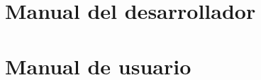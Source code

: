 \null\vfill

\appendix

\chapter{Manual del desarrollador}

\newpage{\ }
\cleardoublepage

\chapter{Manual de usuario}



% 

